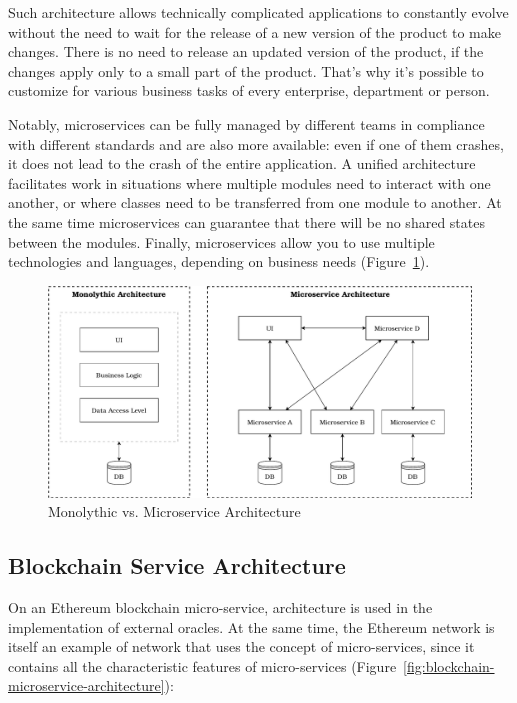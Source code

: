 \documentclass{article}
\begin{document}
\begin{multicols}{2}
Such architecture allows technically complicated applications to constantly evolve without the need to wait for the release of a new version of the product to make changes. There is no need to release an updated version of the product, if the changes apply only to a small part of the product. That’s why it’s possible to customize for various business tasks of every enterprise, department or person.

Notably, microservices can be fully managed by different teams in compliance with different standards and are also more available: even if one of them crashes, it does not lead to the crash of the entire application. A unified architecture facilitates work in situations where multiple modules need to interact with one another, or where classes need to be transferred from one module to another. At the same time microservices can guarantee that there will be no shared states between the modules. Finally, microservices allow you to use multiple technologies and languages, depending on business needs (Figure~\ref{fig:microservice-vs-monolyth}).

\begin{figure}
  \centering
  \includegraphics[width=\textwidth]{microservice-vs-monolyth.pdf}
  \caption{Monolythic vs. Microservice Architecture}
  \label{fig:microservice-vs-monolyth}
\end{figure}

\subsection{Blockchain Serviсe Architecture}

On an Ethereum blockchain micro-service, architecture is used in the implementation of external oracles. At the same time, the Ethereum network is itself an example of network that uses the concept of micro-services, since it contains all the characteristic features of micro-services
(Figure~\ref{fig:blockchain-microservice-architecture}):


\end{multicols}
\end{document}
